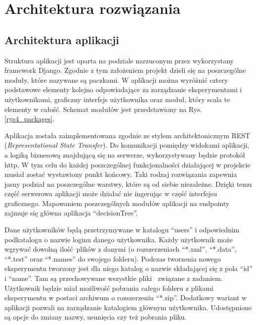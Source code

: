 \chapter{Architektura rozwiązania}
\section{Architektura aplikacji}
Struktura aplikacji jest oparta na podziale narzuconym przez wykorzystany framework Django. Zgodnie z tym założeniem projekt dzieli się na poszczególne moduły, które nazywane są paczkami.  W aplikacji można wyróżnić cztery podstawowe elementy kolejno odpowiadające za zarządzanie eksperymentami i użytkownikami, graficzny interfejs użytkownika oraz moduł, który scala te elementy w całość. Schemat modułów jest przedstawiony na Rys. \ref{rys4_packages}. 

Aplikacja została zaimplementowana zgodnie ze stylem architektonicznym REST (\textit{Representational State Transfer}). Do komunikacji pomiędzy widokami aplikacji, a logiką biznesową znajdującą się na serwerze, wykorzystywany będzie protokół http. W tym celu do każdej poszczególnej funkcjonalności działającej w projekcie musiał zostać wystawiony punkt końcowy. Taki rodzaj rozwiązania zapewnia jasny podział na poszczególne warstwy, które są od siebie niezależne. Dzięki temu część serwerowa aplikacji może działać nie ingerując w część interfejsu graficznego. Mapowaniem poszczególnych modułów aplikacji na endpointy zajmuje się główna aplikacja \enquote{decisionTree}. 


Dane użytkowników będą przetrzymywane w katalogu \enquote{users} i odpowiednim podkatalogu o nazwie loginu danego użytkownika. Każdy użytkownik może wgrywać dowolną ilość plików z danymi (o rozszerzeniach \enquote{*.xml}, \enquote{*.data}, \enquote{*.test} oraz \enquote{*.names} do swojego folderu). Podczas tworzenia nowego eksperymentu tworzony jest dla niego katalog o nazwie składającej się z pola  \enquote{id} i \enquote{name}. Tam są przechowywane wszystkie pliki  związane z zadaniem. Użytkownik będzie miał możliwość pobrania całego folderu z plikami eksperymentu w postaci archiwum o rozszerzeniu  \enquote{*.zip}. Dodatkowy wariant w aplikacji pozwali na zarządzanie katalogiem głównym użytkownika. Udostępnione są opcje do zmiany nazwy, usunięcia czy też pobrania pliku. 

